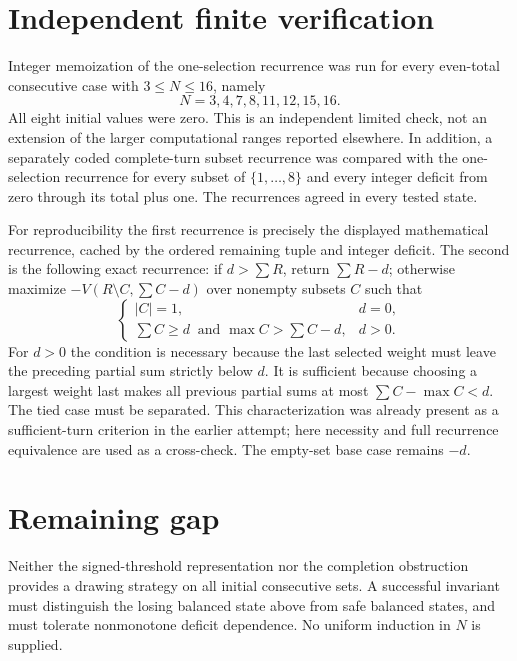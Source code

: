 \documentclass[11pt]{article}
\theoremstyle{definition}
\begin{document}
\section*{Independent finite verification}
Integer memoization of the one-selection recurrence was run for every even-total consecutive case with $3\le N\le16$, namely
\[
 N=3,4,7,8,11,12,15,16.
\]
All eight initial values were zero. This is an independent limited check, not an extension of the larger computational ranges reported elsewhere. In addition, a separately coded complete-turn subset recurrence was compared with the one-selection recurrence for every subset of $\{1,\ldots,8\}$ and every integer deficit from zero through its total plus one. The recurrences agreed in every tested state.

For reproducibility the first recurrence is precisely the displayed mathematical recurrence, cached by the ordered remaining tuple and integer deficit. The second is the following exact recurrence: if $d>\sum R$, return $\sum R-d$; otherwise maximize
$-V(R\setminus C,\sum C-d)$ over nonempty subsets $C$ such that
\[
 \begin{cases}
 |C|=1,&d=0,\\
 \sum C\ge d\ \text{ and }\max C>\sum C-d,&d>0.
 \end{cases}
\]
For $d>0$ the condition is necessary because the last selected weight must leave the preceding partial sum strictly below $d$. It is sufficient because choosing a largest weight last makes all previous partial sums at most $\sum C-\max C<d$. The tied case must be separated. This characterization was already present as a sufficient-turn criterion in the earlier attempt; here necessity and full recurrence equivalence are used as a cross-check. The empty-set base case remains $-d$.

\section*{Remaining gap}
Neither the signed-threshold representation nor the completion obstruction provides a drawing strategy on all initial consecutive sets. A successful invariant must distinguish the losing balanced state above from safe balanced states, and must tolerate nonmonotone deficit dependence. No uniform induction in $N$ is supplied.
\end{document}
